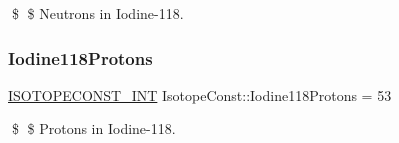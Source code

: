 \$ \$ Neutrons in Iodine-\/118. \mbox{\label{group___isotope_const-_iodine-_i118_ga0624243029313224b52cdaf226d35f9c}} 
\subsubsection{\texorpdfstring{Iodine118\+Protons}{Iodine118Protons}}
{\footnotesize\ttfamily \mbox{\hyperlink{group___isotope_const-_macros_ga5f18360b3e99483a35c32d789e62621c}{I\+S\+O\+T\+O\+P\+E\+C\+O\+N\+S\+T\+\_\+\+I\+NT}} Isotope\+Const\+::\+Iodine118\+Protons = 53}

\$ \$ Protons in Iodine-\/118. 